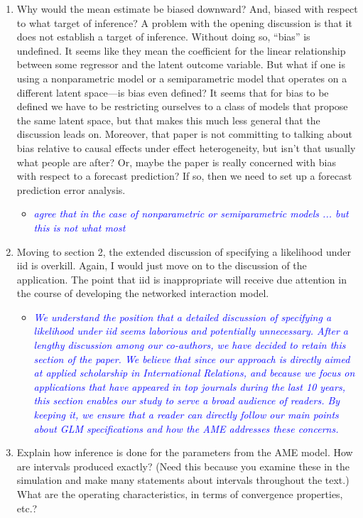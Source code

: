 \begin{enumerate}
	\item Why would the mean estimate be biased downward?  And, biased with respect to what target of inference?  A problem with the opening discussion is that it does not establish a target of inference.  Without doing so, ``bias'' is undefined.  It seems like they mean the coefficient for the linear relationship between some regressor and the latent outcome variable. But what if one is using a nonparametric model or a semiparametric model that operates on a different latent space---is bias even defined?  It seems that for bias to be defined we have to be restricting ourselves to a class of models that propose the same latent space, but that makes this much less general that the discussion leads on.  Moreover, that paper is not committing to talking about bias relative to causal effects under effect heterogeneity, but isn't that usually what people are after?  Or, maybe the paper is really concerned with bias with respect to a forecast prediction? If so, then we need to set up a forecast prediction error analysis.
	\begin{itemize}
		\item  \emph{ \textcolor{blue}{
		agree that in the case of nonparametric or semiparametric models ... but this is not what most
		}}
	\end{itemize}
	\item Moving to section 2, the extended discussion of specifying a likelihood under iid is overkill.  Again, I would just move on to the discussion of the application. The point that iid is inappropriate will receive due attention in the course of developing the networked interaction model.
	\begin{itemize}
		\item  \emph{ \textcolor{blue}{
		We understand the position that a detailed discussion of specifying a likelihood under iid seems laborious and potentially unnecessary. After a lengthy discussion among our co-authors, we have decided to retain this section of the paper. We believe that since our approach is directly aimed at applied scholarship in International Relations, and because we focus on applications that have appeared in top journals during the last 10 years, this section enables our study to serve a broad audience of readers. By keeping it, we ensure that a reader can directly follow our main points about GLM specifications and how the AME addresses these concerns. 
		}}
	\end{itemize}
	\item Explain how inference is done for the parameters from the AME model. How are intervals produced exactly? (Need this because you examine these in the simulation and make many statements about intervals throughout the text.)  What are the operating characteristics, in terms of convergence properties, etc.?

\end{enumerate}
